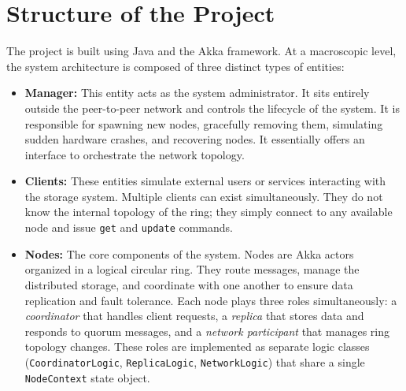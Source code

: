 \section{Structure of the Project}
The project is built using Java and the Akka framework. At a
macroscopic level, the system architecture is composed of three
distinct types of entities:

\begin{itemize}
    \item \textbf{Manager:} This entity acts as the system
        administrator. It sits entirely outside the peer-to-peer
        network and controls the lifecycle of the system. It is
        responsible for spawning new nodes, gracefully removing
        them, simulating sudden hardware crashes, and recovering
        nodes. It essentially offers an interface to orchestrate
        the network topology.
    \item \textbf{Clients:} These entities simulate external users
        or services interacting with the storage system. Multiple
        clients can exist simultaneously. They do not know the
        internal topology of the ring; they simply connect to any
        available node and issue \texttt{get} and \texttt{update}
        commands.
    \item \textbf{Nodes:} The core components of the system. Nodes
        are Akka actors organized in a logical circular ring. They
        route messages, manage the distributed storage, and
        coordinate with one another to ensure data replication and
        fault tolerance. Each node plays three roles simultaneously:
        a \emph{coordinator} that handles client requests, a
        \emph{replica} that stores data and responds to quorum
        messages, and a \emph{network participant} that manages
        ring topology changes. These roles are implemented as
        separate logic classes (\texttt{CoordinatorLogic},
        \texttt{ReplicaLogic}, \texttt{NetworkLogic}) that share a
        single \texttt{NodeContext} state object.
\end{itemize}

\vspace{0.5cm}

